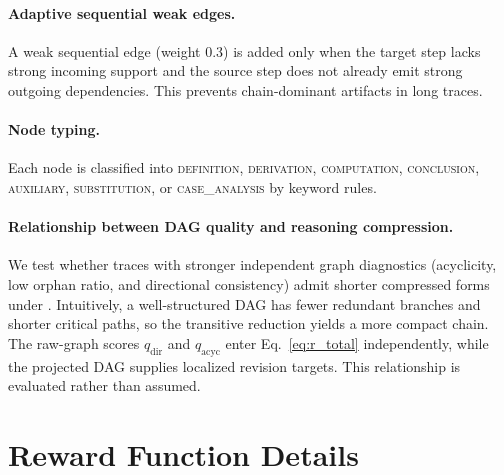 

\paragraph{Adaptive sequential weak edges.}
A weak sequential edge (weight 0.3) is added only when the target step lacks strong incoming support and the source step does not already emit strong outgoing dependencies.
This prevents chain-dominant artifacts in long traces.

\paragraph{Node typing.}
Each node is classified into \textsc{definition}, \textsc{derivation}, \textsc{computation}, \textsc{conclusion}, \textsc{auxiliary}, \textsc{substitution}, or \textsc{case\_analysis} by keyword rules.

\paragraph{Relationship between DAG quality and reasoning compression.}
We test whether traces with stronger independent graph diagnostics (acyclicity, low orphan ratio, and directional consistency) admit shorter compressed forms under \framework.
Intuitively, a well-structured DAG has fewer redundant branches and shorter critical paths, so the transitive reduction yields a more compact chain.
The raw-graph scores $q_{\mathrm{dir}}$ and $q_{\mathrm{acyc}}$ enter Eq.~\ref{eq:r_total} independently, while the projected DAG supplies localized revision targets. This relationship is evaluated rather than assumed.

\section{Reward Function Details}
\label{app:rewards}

